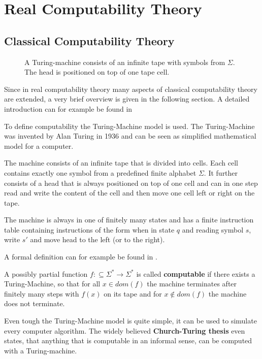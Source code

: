 \section{Real Computability Theory}\label{sec:real computability}
\subsection{Classical Computability Theory}
 \begin{figure}[h]
   \centering
   
   \caption{A Turing-machine consists of an infinite tape with symbols from
   $\Sigma$. The head is positioned on top of one tape cell.}
 \end{figure}
 Since in real computability theory many aspects of classical computability theory are extended, 
 a very brief overview is given in the following section. 
 A detailed introduction can for example be found in \cite{computability}

 To define computability the Turing-Machine model is used.
 The Turing-Machine was invented by Alan Turing in 1936 \cite{Turing} and can
 be seen as simplified mathematical model for a computer.

 The machine consists of an infinite tape that is divided into cells. 
 Each cell contains exactly one symbol from a predefined finite alphabet
 $\Sigma$.
 It further consists of a head that is always positioned on top of one cell 
 and can in one step read and write the content of the cell and then move one
 cell left or right on the tape.

 The machine is always in one of finitely many states and has a finite
 instruction table containing instructions of the form when in state $q$ and
 reading symbol $s$, write $s'$ and move head to the left (or to the right).

 A formal definition can for example be found in \cite{Hopmann}.
 
 \begin{definition}
 	A possibly partial function $f:\subseteq \Sigma^* \to \Sigma^*$ is called \textbf{computable} if there exists 
 	a Turing-Machine, so that for all $x \in dom(f)$ the machine terminates after finitely many steps with $f(x)$ on its 
 	tape and for $x \not \in dom(f)$ the machine does not terminate.
 \end{definition}

 Even tough the Turing-Machine model is quite simple, it can be used to
 simulate every computer algorithm.
 The widely believed \textbf{Church-Turing thesis} even states, that anything
 that is computable in an informal sense, can be computed with a
 Turing-machine.

